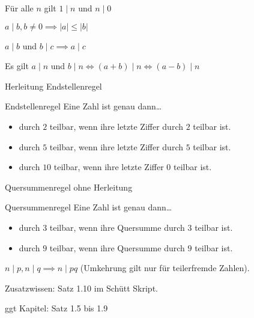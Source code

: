 \documentclass[../../main.tex]{subfiles}
\begin{document}
\begin{theorem}{}
    Für alle $n$ gilt $1\mid n$ und $n\mid 0$
\end{theorem}

\begin{theorem}{}
    $a\mid b,b\neq 0\implies |a|\leq|b|$
\end{theorem}

\begin{theorem}{}
    $a\mid b$ und $b\mid c\implies a\mid c$
\end{theorem}

\begin{theorem}{}
    Es gilt $a\mid n$ und $b\mid n\iff (a+b)\mid n\iff (a-b)\mid n$
\end{theorem}

Herleitung Endstellenregel
\begin{theorem}{Endstellenregel}
    Eine Zahl ist genau dann\dots
    \begin{itemize}
        \item durch $2$ teilbar, wenn ihre letzte Ziffer durch $2$ teilbar ist.
        \item durch $5$ teilbar, wenn ihre letzte Ziffer durch $5$ teilbar ist.
        \item durch $10$ teilbar, wenn ihre letzte Ziffer $0$ teilbar ist.
    \end{itemize}
\end{theorem}

Quersummenregel ohne Herleitung
\begin{theorem}{Quersummenregel}
    Eine Zahl ist genau dann\dots
    \begin{itemize}
        \item durch $3$ teilbar, wenn ihre Quersumme durch $3$ teilbar ist.
        \item durch $9$ teilbar, wenn ihre Quersumme durch $9$ teilbar ist.
    \end{itemize}
\end{theorem}

\begin{theorem}{}
    $n\mid p,n\mid q \implies n\mid pq$ (Umkehrung gilt nur für teilerfremde Zahlen).
\end{theorem}

Zusatzwissen: Satz 1.10 im Schütt Skript.

ggt Kapitel: Satz 1.5 bis 1.9
\end{document}

